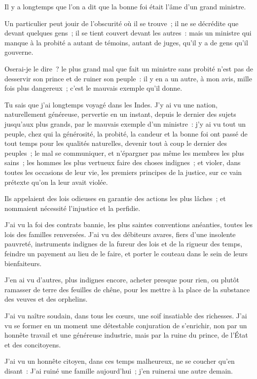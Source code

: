 \documentclass[french,twoside]{book} %
\begin{document}
\noindent Il y a longtemps que l’on a dit que la bonne foi était l’âme d’un grand ministre.\par
Un particulier peut jouir de l’obscurité où il se trouve ; il ne se décrédite que devant quelques gens ; il se tient couvert devant les autres : mais un ministre qui manque à la probité a autant de témoins, autant de juges, qu’il y a de gens qu’il gouverne.\par
Oserai-je le dire ? le plus grand mal que fait un ministre sans probité n’est pas de desservir son prince et de ruiner son peuple : il y en a un autre, à mon avis, mille fois plus dangereux ; c’est le mauvais exemple qu’il donne.\par
Tu sais que j’ai longtemps voyagé dans les Indes. J’y ai vu une nation, naturellement généreuse, pervertie en un instant, depuis le dernier des sujets jusqu’aux plus grands, par le mauvais exemple d’un ministre : j’y ai vu tout un peuple, chez qui la générosité, la probité, la candeur et la bonne foi ont passé de tout temps pour les qualités naturelles, devenir tout à coup le dernier des peuples ; le mal se communiquer, et n’épargner pas même les membres les plus sains ; les hommes les plus vertueux faire des choses indignes ; et violer, dans toutes les occasions de leur vie, les premiers principes de la justice, sur ce vain prétexte qu’on la leur avait violée.\par
Ils appelaient des lois odieuses en garantie des actions les plus lâches ; et nommaient nécessité l’injustice et la perfidie.\par
J’ai vu la foi des contrats bannie, les plus saintes conventions anéanties, toutes les lois des familles renversées. J’ai vu des débiteurs avares, fiers d’une insolente pauvreté, instruments indignes de la fureur des lois et de la rigueur des temps, feindre un payement au lieu de le faire, et porter le couteau dans le sein de leurs bienfaiteurs.\par
J’en ai vu d’autres, plus indignes encore, acheter presque pour rien, ou plutôt ramasser de terre des feuilles de chêne, pour les mettre à la place de la substance des veuves et des orphelins.\par
J’ai vu naître soudain, dans tous les cœurs, une soif insatiable des richesses. J’ai vu se former en un moment une détestable conjuration de s’enrichir, non par un honnête travail et une généreuse industrie, mais par la ruine du prince, de l’État et des concitoyens.\par
J’ai vu un honnête citoyen, dans ces temps malheureux, ne se coucher qu’en disant : J’ai ruiné une famille aujourd’hui ; j’en ruinerai une autre demain.\par
\end{document}
